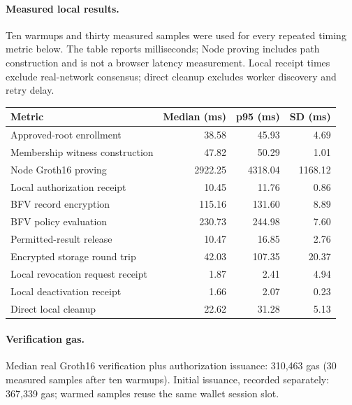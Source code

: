 \paragraph{Measured local results.} Ten warmups and thirty measured samples were used for every repeated timing metric below. The table reports milliseconds; Node proving includes path construction and is not a browser latency measurement. Local receipt times exclude real-network consensus; direct cleanup excludes worker discovery and retry delay.
\begin{center}\begin{tabular}{lrrr}\toprule Metric & Median (ms) & p95 (ms) & SD (ms)\\\midrule
Approved-root enrollment & 38.58 & 45.93 & 4.69\\
Membership witness construction & 47.82 & 50.29 & 1.01\\
Node Groth16 proving & 2922.25 & 4318.04 & 1168.12\\
Local authorization receipt & 10.45 & 11.76 & 0.86\\
BFV record encryption & 115.16 & 131.60 & 8.89\\
BFV policy evaluation & 230.73 & 244.98 & 7.60\\
Permitted-result release & 10.47 & 16.85 & 2.76\\
Encrypted storage round trip & 42.03 & 107.35 & 20.37\\
Local revocation request receipt & 1.87 & 2.41 & 4.94\\
Local deactivation receipt & 1.66 & 2.07 & 0.23\\
Direct local cleanup & 22.62 & 31.28 & 5.13\\
\bottomrule\end{tabular}\end{center}
\paragraph{Verification gas.} Median real Groth16 verification plus authorization issuance: 310,463 gas (30 measured samples after ten warmups). Initial issuance, recorded separately: 367,339 gas; warmed samples reuse the same wallet session slot.

